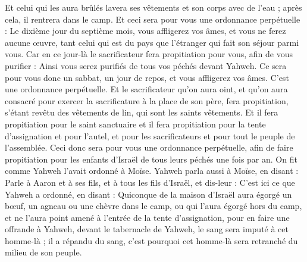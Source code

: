 \begin{multicols}{2}
Et celui qui les aura brûlés lavera ses vêtements et son corps avec de l'eau ; après cela, il rentrera dans le camp.
Et ceci sera pour vous une ordonnance perpétuelle : Le dixième jour du septième mois, vous affligerez vos âmes, et vous ne ferez aucune œuvre, tant celui qui est du pays que l'étranger qui fait son séjour parmi vous.
Car en ce jour-là le sacrificateur fera propitiation pour vous, afin de vous purifier : Ainsi vous serez purifiés de tous vos péchés devant Yahweh.
Ce sera pour vous donc un sabbat, un jour de repos, et vous affligerez vos âmes. C'est une ordonnance perpétuelle.
Et le sacrificateur qu'on aura oint, et qu'on aura consacré pour exercer la sacrificature à la place de son père, fera propitiation, s'étant revêtu des vêtements de lin, qui sont les saints vêtements.
Et il fera propitiation pour le saint sanctuaire et il fera propitiation pour la tente d'assignation et pour l'autel, et pour les sacrificateurs et pour tout le peuple de l'assemblée.
Ceci donc sera pour vous une ordonnance perpétuelle, afin de faire propitiation pour les enfants d'Israël de tous leurs péchés une fois par an. On fit comme Yahweh l'avait ordonné à Moïse.
\VerseOne{}Yahweh parla aussi à Moïse, en disant :
Parle à Aaron et à ses fils, et à tous les fils d'Israël, et dis-leur : C'est ici ce que Yahweh a ordonné, en disant :
Quiconque de la maison d'Israël aura égorgé un bœuf, un agneau ou une chèvre dans le camp, ou qui l'aura égorgé hors du camp,
et ne l'aura point amené à l'entrée de la tente d'assignation, pour en faire une offrande à Yahweh, devant le tabernacle de Yahweh, le sang sera imputé à cet homme-là ; il a répandu du sang, c'est pourquoi cet homme-là sera retranché du milieu de son peuple.

\end{multicols}
